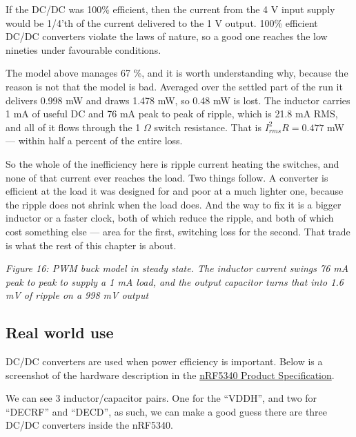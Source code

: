 If the DC/DC was 100\% efficient, then the current from the 4 V input
supply would be 1/4'th of the current delivered to the 1 V output. 100\%
efficient DC/DC converters violate the laws of nature, so a good one
reaches the low nineties under favourable conditions.

The model above manages 67 \%, and it is worth understanding why,
because the reason is not that the model is bad. Averaged over the
settled part of the run it delivers 0.998 mW and draws 1.478 mW, so 0.48
mW is lost. The inductor carries 1 mA of useful DC and 76 mA peak to
peak of ripple, which is 21.8 mA RMS, and all of it flows through the 1
\(\Omega\) switch resistance. That is \(I_{rms}^2R = 0.477\) mW ---
within half a percent of the entire loss.

So the whole of the inefficiency here is ripple current heating the
switches, and none of that current ever reaches the load. Two things
follow. A converter is efficient at the load it was designed for and
poor at a much lighter one, because the ripple does not shrink when the
load does. And the way to fix it is a bigger inductor or a faster clock,
both of which reduce the ripple, and both of which cost something else
--- area for the first, switching loss for the second. That trade is
what the rest of this chapter is about.


{
\centering
{}
}

\emph{Figure 16: PWM buck model in steady state. The inductor current
swings 76 mA peak to peak to supply a 1 mA load, and the output
capacitor turns that into 1.6 mV of ripple on a 998 mV output}

\subsection{Real world use}\label{real-world-use}

DC/DC converters are used when power efficiency is important. Below is a
screenshot of the hardware description in the
\href{https://docs.nordicsemi.com/bundle/nRF5340_PS_v1.3.1/resource/nRF5340_PS_v1.3.1.pdf}{nRF5340
Product Specification}.

We can see 3 inductor/capacitor pairs. One for the ``VDDH'', and two for
``DECRF'' and ``DECD'', as such, we can make a good guess there are
three DC/DC converters inside the nRF5340.


{
\centering
{}
}

